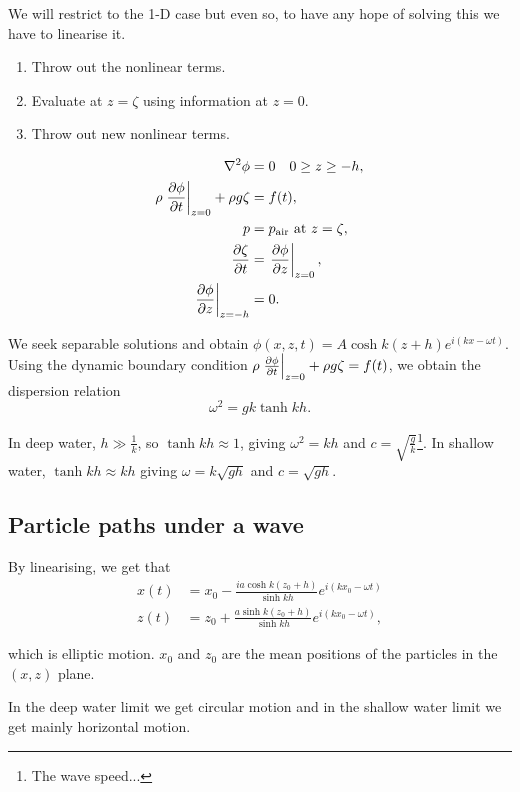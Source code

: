 \documentclass{notes}
\newcommand{\lapl}{\nabla^2}
\begin{document}
We will restrict to the 1-D case but even so, to have any hope of
solving this we have to linearise it.
\begin{enumerate}
\item Throw out the nonlinear terms.
\item Evaluate at $z=\zeta$ using information at $z=0$.
\item Throw out new nonlinear terms.
\end{enumerate}

\begin{align*}
  \lapl\phi &= 0 \quad 0 \ge z \ge -h, \\
  \rho \left. \pd{\phi}{t}\right|_{z=0} + \rho g \zeta &= f(t), \\
  p &= p_{\text{air}} \text{ at } z = \zeta, \\
  \pd{\zeta}{t} &= \left.\pd{\phi}{z}\right|_{z = 0}, \\
  \left.\pd{\phi}{z}\right|_{z=-h} &= 0.
\end{align*}

We seek separable solutions and obtain $\phi(x,z,t) = A \cosh k
\left(z+h \right) e^{i \left( k x - \omega t \right)}$.  Using the
dynamic boundary condition $\rho \left.\frac{\partial \phi}{\partial t}\right|_{z=0} +
\rho g \zeta = f(t)$, we obtain the dispersion relation
\[
\omega^2 = g k \tanh k h.
\]

In deep water, $h \gg \frac{1}{k}$, so $\tanh k h \approx 1$, giving
$\omega^2 = k h$ and $c = \sqrt{\frac{g}{k}}$\footnote{The wave
  speed...}.  In shallow water, $\tanh k h \approx k h$ giving $\omega
= k \sqrt{g h}$ and $c = \sqrt{g h}$.

\subsection{Particle paths under a wave}

By linearising, we get that
\begin{align*}
  x(t) &= x_0 - \frac{i a \cosh k \left(z_0 +h \right)}{\sinh k h}
  e^{i \left( k x_0 - \omega t
    \right)} \\
  z(t) &= z_0 + \frac{a \sinh k \left(z_0 +h \right)}{\sinh k h} e^{i
    \left( k x_0 - \omega t \right)},
\end{align*}

which is elliptic motion. $x_0$ and $z_0$ are the mean positions of
the particles in the $(x,z)$ plane.

In the deep water limit we get circular motion and in the shallow
water limit we get mainly horizontal motion.
\end{document}
